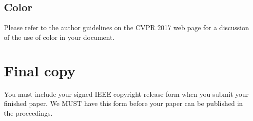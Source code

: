 \documentclass[10pt,twocolumn,letterpaper]{article}
\begin{document}
\subsection{Color}

Please refer to the author guidelines on the CVPR 2017 web page for a discussion
of the use of color in your document.

\section{Final copy}

You must include your signed IEEE copyright release form when you submit
your finished paper. We MUST have this form before your paper can be
published in the proceedings.


{\small


}
\end{document}

